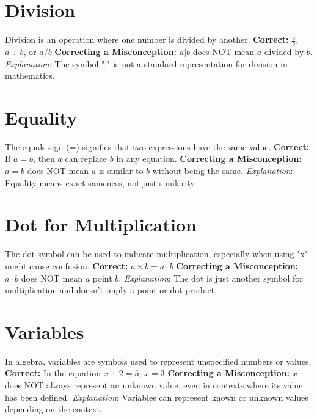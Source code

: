 \documentclass[12pt]{article}
\newenvironment{correct}{\noindent\textbf{Correct:}}{}
\newenvironment{misconception}{\noindent\textbf{Correcting a Misconception:}}{}
\newenvironment{explanation}{\noindent\textit{Explanation}:}{\vspace{1em}}
\begin{document}
\section*{Division}
Division is an operation where one number is divided by another.
\begin{correct} \(\frac{a}{b}\), \(a \div b\), or \(a/b\) \end{correct}
\begin{misconception} \(a|b\) does NOT mean \(a\) divided by \(b\). \end{misconception}
\begin{explanation} The symbol "|" is not a standard representation for division in mathematics. \end{explanation}

\section*{Equality}
The equals sign (=) signifies that two expressions have the same value.
\begin{correct} If \(a = b\), then \(a\) can replace \(b\) in any equation. \end{correct}
\begin{misconception} \(a = b\) does NOT mean \(a\) is similar to \(b\) without being the same. \end{misconception}
\begin{explanation} Equality means exact sameness, not just similarity. \end{explanation}

\section*{Dot for Multiplication}
The dot symbol can be used to indicate multiplication, especially when using "x" might cause confusion.
\begin{correct} \(a \times b = a \cdot b\) \end{correct}
\begin{misconception} \(a \cdot b\) does NOT mean \(a\) point \(b\). \end{misconception}
\begin{explanation} The dot is just another symbol for multiplication and doesn't imply a point or dot product. \end{explanation}

\section*{Variables}
In algebra, variables are symbols used to represent unspecified numbers or values.
\begin{correct} In the equation \(x + 2 = 5\), \(x = 3\) \end{correct}
\begin{misconception} \(x\) does NOT always represent an unknown value, even in contexts where its value has been defined. \end{misconception}
\begin{explanation} Variables can represent known or unknown values depending on the context. \end{explanation}
\end{document}
